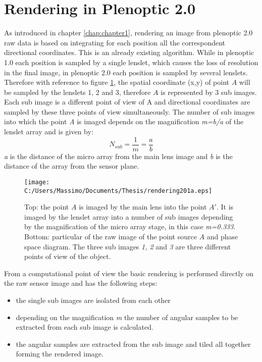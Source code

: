 \section{Rendering in Plenoptic 2.0}
\label{sec:rendering}
As introduced in chapter \ref{chap:chapter1}, rendering an image from plenoptic 2.0  raw data is based on integrating for each position all the correspondent directional coordinates. This is an already existing algorithm. While in plenoptic 1.0 each position is sampled by a single lenslet, which causes the loss of resolution in the final image, in plenoptic 2.0 each position is sampled by several lenslets. Therefore with reference to figure \ref{fig:render202}, the spatial coordinate (x,y) of point $A$ will be sampled by the lenslets 1, 2 and 3, therefore $A$ is represented by 3 sub images. Each sub image is a different point of view of A and directional coordinates are sampled by these three points of view simultaneously. The number of sub images into which the point \textit{A} is imaged depends on the magnification \textit{m=b/a} of the lenslet array and is given by:
\begin{equation}
\label{eq:point_of_view}
N_{sub} = \dfrac{1}{m}=\dfrac{a}{b}
\end{equation}
 \textit{a} is the distance of the micro array from the main lens image and \textit{b} is the distance of the array from the sensor plane. 
\begin{figure}[H]
	\centering
	\texttt{[image: C:/Users/Massimo/Documents/Thesis/rendering201a.eps]}
	\caption{\label{fig:render202} Top: the point $A$ is imaged by the main lens into the point $A'$. It is imaged by the lenslet array into a number of sub images depending by the magnification of the micro array stage, in this case \textit{m=0.333}. Bottom: particular of the raw image of the point source $A$ and phase space diagram. The three sub images \textit{1, 2} and \textit{3} are three different points of view of the object.  }
\end{figure}
From a computational point of view the basic rendering is performed directly on the raw sensor image and has the following steps:
\begin{itemize}
	\item the single sub images are isolated from each other 
	\item depending on the magnification \textit{m} the number of angular samples to be extracted from each sub image is calculated.
	\item the angular samples are extracted from the sub image and tiled all together forming the rendered image.
\end{itemize}

